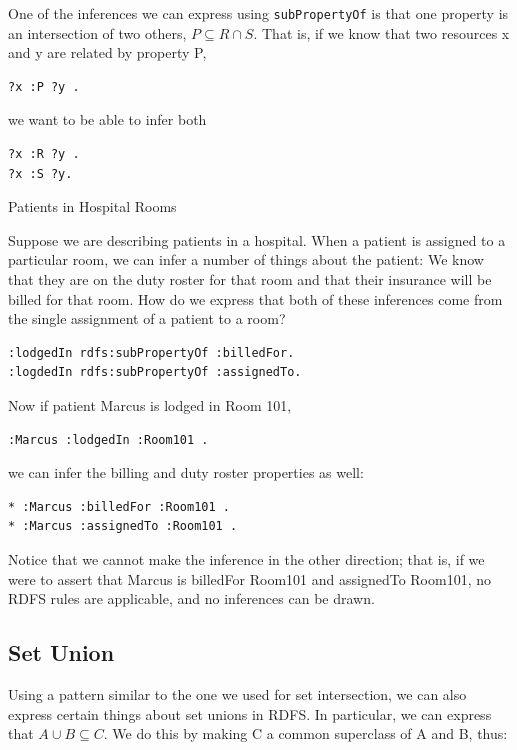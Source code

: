 One of the inferences we can express using \texttt{subPropertyOf} is that one
property is an intersection
of two others, $P \subseteq R \cap S$. That is, if we know that two resources x and y
are related by property P,

\begin{lstlisting}
?x :P ?y .
\end{lstlisting}

we want to be able to infer both

\begin{lstlisting}
?x :R ?y .
?x :S ?y.
\end{lstlisting}

\begin{example}{Patients in Hospital Rooms}

Suppose we are describing patients in a hospital. When a patient is
assigned to a particular room, we can infer a number of things about the
patient: We know that they are on the duty roster for that room and that
their insurance will be billed for that room. How do we express that
both of these inferences come from the single assignment of a patient to
a room?

\begin{lstlisting}
:lodgedIn rdfs:subPropertyOf :billedFor.
:logdedIn rdfs:subPropertyOf :assignedTo.
\end{lstlisting}

Now if patient Marcus is lodged in Room 101,

\begin{lstlisting}
:Marcus :lodgedIn :Room101 .
\end{lstlisting}

we can infer the billing and duty roster properties as well:

\begin{lstlisting}
* :Marcus :billedFor :Room101 .
* :Marcus :assignedTo :Room101 .
\end{lstlisting}

Notice that we cannot make the inference in the other direction; that
is, if we were to assert that Marcus is billedFor Room101 and assignedTo
Room101, no RDFS rules are applicable, and no inferences can be drawn.
\end{example}


\subsection{Set Union}
\label{sunion}
Using a pattern similar to the one we used for set intersection, we can
also express certain things about set unions in RDFS. In particular, we
can express that $A \cup B \subseteq C$. We do this by making C a common superclass
of A and B, thus:

